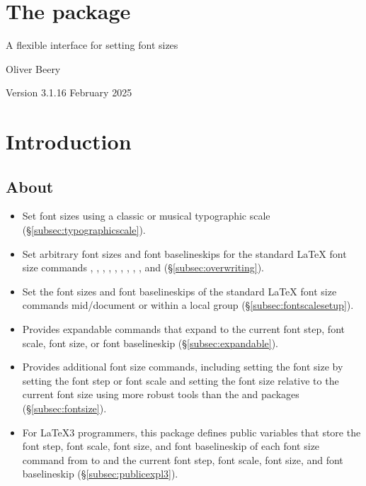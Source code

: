 \documentclass{beery}
\begin{document}
\section*
  {%
    The  package%
  }

A flexible interface for setting font sizes

Oliver Beery

Version 3.1.1\quad{}6 February 2025


\section{Introduction}
\label{sec:intro}

\subsection{About}
\label{subsec:about}

\begin{itemize}
  \item
  Set font sizes using a classic or musical typographic scale (\S\ref{subsec:typographicscale}).
  \item
  Set arbitrary font sizes and font baselineskips for the standard \LaTeX{} font size commands , , , , , , , , , and  (\S\ref{subsec:overwriting}).
  \item
  Set the font sizes and font baselineskips of the standard \LaTeX{} font size commands mid\-/document or within a local group (\S\ref{subsec:fontscalesetup}).
  \item
  Provides expandable commands that expand to the current font step, font scale, font size, or font baselineskip (\S\ref{subsec:expandable}).
  \item
  Provides additional font size commands, including setting the font size by setting the font step or font scale and setting the font size relative to the current font size using more robust tools than the  and  packages (\S\ref{subsec:fontsize}).
  \item
  For \LaTeX3 programmers, this package defines public  variables that store the font step, font scale, font size, and font baselineskip of each font size command from  to  and the current font step, font scale, font size, and font baselineskip (\S\ref{subsec:publicexpl3}).
\end{itemize}
\end{document}
